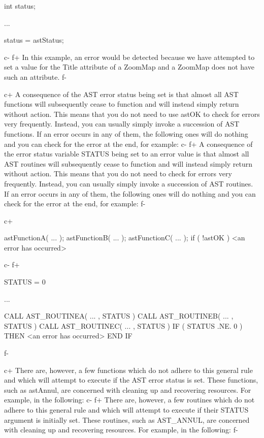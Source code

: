 \documentclass[twoside,11pt]{starlink}
\begin{document}
\small
\begin{terminalv}
int status;

...


status = astStatus;
\end{terminalv}
\normalsize
c-
f+
In this example, an error would be detected because we have attempted
to set a value for the Title attribute of a ZoomMap and a ZoomMap does
not have such an attribute.
f-

c+
A consequence of the AST error status being set is that almost all AST
functions will subsequently cease to function and will instead simply
return without action.  This means that you do not need to use astOK
to check for errors very frequently. Instead, you can usually simply
invoke a succession of AST functions. If an error occurs in any of
them, the following ones will do nothing and you can check for the
error at the end, for example:
c-
f+
A consequence of the error status variable STATUS being set to an
error value is that almost all AST routines will subsequently cease to
function and will instead simply return without action.  This means
that you do not need to check for errors very frequently. Instead, you
can usually simply invoke a succession of AST routines. If an error
occurs in any of them, the following ones will do nothing and you can
check for the error at the end, for example:
f-

c+
\small
\begin{terminalv}
astFunctionA( ... );
astFunctionB( ... );
astFunctionC( ... );
if ( !astOK ) {
   <an error has occurred>
}
\end{terminalv}
\normalsize
c-
f+
\small
\begin{terminalv}
      STATUS = 0

      ...

      CALL AST_ROUTINEA( ... , STATUS )
      CALL AST_ROUTINEB( ... , STATUS )
      CALL AST_ROUTINEC( ... , STATUS )
      IF ( STATUS .NE. 0 ) THEN
         <an error has occurred>
      END IF
\end{terminalv}
\normalsize
f-

c+
There are, however, a few functions which do not adhere to this
general rule and which will attempt to execute if the AST error status
is set. These functions, such as astAnnul, are concerned with cleaning
up and recovering resources. For example, in the following:
c-
f+
There are, however, a few routines which do not adhere to this general
rule and which will attempt to execute if their STATUS argument is
initially set.  These routines, such as AST\_ANNUL, are concerned with
cleaning up and recovering resources. For example, in the following:
f-
\end{document}
